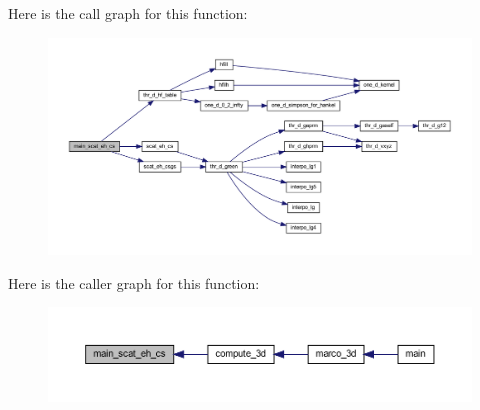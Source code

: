 Here is the call graph for this function\+:
\nopagebreak
\begin{figure}[H]
\begin{center}
\leavevmode
\includegraphics[width=350pt]{Marco_8f90_a631581f8c126c181d87636784b2f6720_cgraph}
\end{center}
\end{figure}
Here is the caller graph for this function\+:
\nopagebreak
\begin{figure}[H]
\begin{center}
\leavevmode
\includegraphics[width=350pt]{Marco_8f90_a631581f8c126c181d87636784b2f6720_icgraph}
\end{center}
\end{figure}
\mbox{\label{Marco_8f90_a691701461b67027619c9ea8471ee24ea}} 
